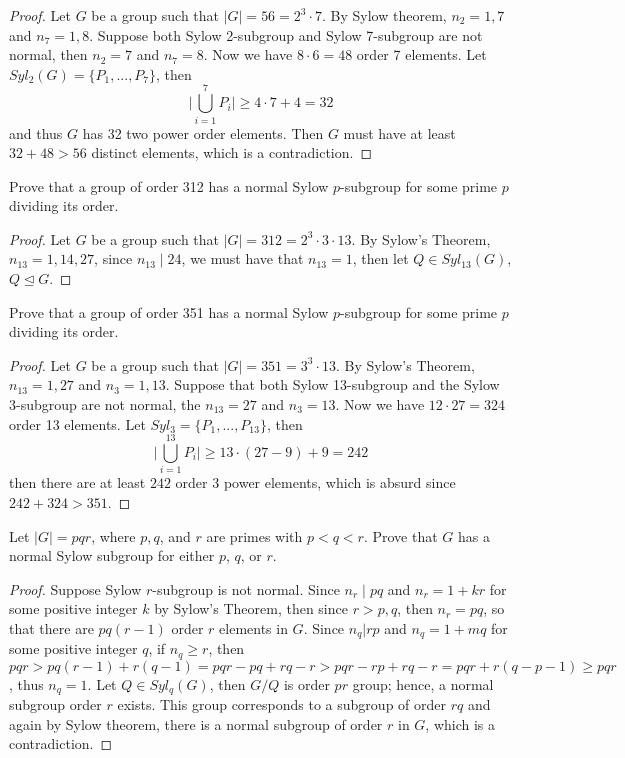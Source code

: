 \documentclass{article}
\newenvironment{problem}[2][Problem]{\begin{trivlist}
\item[\hskip \labelsep {\bfseries #1}\hskip \labelsep {\bfseries #2.}]}{\end{trivlist}}
\begin{document}
\begin{proof}
    Let $G$ be a group such that $|G|=56=2^3\cdot 7$. By Sylow theorem, $n_2 = 1, 7$ and $n_7 = 1, 8$. Suppose both Sylow 2-subgroup and Sylow 7-subgroup are not normal, then $n_2 = 7$ and $n_7 =8$. Now we have $8\cdot 6 = 48$ order 7 elements. Let $Syl_2(G)=\{P_1, ..., P_7\}$, then \[     \bigg|\bigcup_{i=1}^7P_i\bigg|\geq 4\cdot 7 +4 = 32       \] and thus $G$ has 32 two power order elements. Then $G$ must have at least $32+48>56$ distinct elements, which is a contradiction. 
\end{proof}
\begin{problem}{14}
        Prove that a group of order 312 has a normal Sylow $p$-subgroup for some prime $p$ dividing its order.
\end{problem}
\begin{proof}
    Let $G$ be a group such that $|G|=312=2^3\cdot 3 \cdot 13$. By Sylow's Theorem, $n_{13}=1, 14, 27$, since $n_{13}\mid 24$, we must have that $n_{13}=1$, then let $Q\in Syl_{13}(G)$, $Q\trianglelefteq G$. 
\end{proof}
\begin{problem}{15}
            Prove that a group of order 351 has a normal Sylow $p$-subgroup for some prime $p$ dividing its order.

\end{problem}
\begin{proof}
    Let $G$ be a group such that $|G|=351=3^3\cdot 13$. By Sylow's Theorem, $n_{13}=1, 27$ and $n_3=1, 13$. Suppose that both Sylow 13-subgroup and the Sylow 3-subgroup are not normal, the $n_{13}=27$ and $n_{3}=13$. Now we have $12 \cdot 27 = 324$ order 13 elements. Let $Syl_{3}=\{P_1, ..., P_{13}\}$, then 
    \[
        \bigg|\bigcup_{i=1}^{13}P_i\bigg|\geq 13\cdot (27-9)+9 = 242
    \]
    then there are at least $242$ order 3 power elements, which is absurd since $242+324>351$. 
\end{proof}
\begin{problem}{16}
        Let $|G| = pqr$, where $p, q$, and $r$ are primes with $p < q < r$. Prove that $G$ has a normal Sylow subgroup for either $p$, $q$, or $r$.
\end{problem}
\begin{proof}
    
    Suppose Sylow $r$-subgroup is not normal. Since $n_r \mid pq$ and $n_r=1+kr$ for some positive integer $k$ by Sylow's Theorem, then since $r >p, q$, then $n_r=pq$, so that there are $pq(r-1)$ order $r$ elements in $G$. Since $n_q|rp$ and $n_q=1+mq$ for some positive integer $q$, if $n_q\geq r$, then 
    \[
        pqr>pq(r-1)+r(q-1) = pqr -pq+ rq-r >pqr -rp+rq-r =pqr+r(q-p-1)\geq pqr
    \]
    , thus $n_q=1$. Let $Q\in Syl_q(G)$, then $G/Q$ is order $pr$ group; hence, a normal subgroup order $r$ exists. This group corresponds to a subgroup of order $rq$ and again by Sylow theorem, there is a normal subgroup of order $r$ in $G$, which is a contradiction. 
\end{proof}
\end{document}
